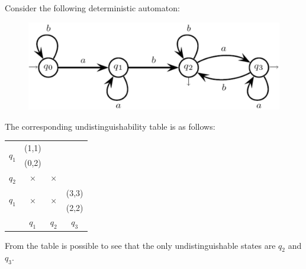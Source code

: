\begin{example}
    Consider the following deterministic automaton: 
    \begin{figure}[H]
        \centering
        \includegraphics[width=0.5\linewidth]{images/fsamin.png}
    \end{figure}
    The corresponding undistinguishability table is as follows: 
    \begin{table}[H]
        \centering
        \begin{tabular}{cclcccc}
        \cline{2-3}
        \multicolumn{1}{c|}{\multirow{2}{*}{$q_1$}} & \multicolumn{2}{c|}{(1,1)}                     &                        &                       &              &             \\
        \multicolumn{1}{c|}{}                       & \multicolumn{2}{c|}{(0,2)}                     &                        &                       &              &             \\ \cline{2-5}
        \multicolumn{1}{c|}{\multirow{2}{*}{$q_2$}} & \multicolumn{2}{c|}{\multirow{2}{*}{$\times$}} & \multicolumn{2}{c|}{\multirow{2}{*}{$\times$}} &              &             \\
        \multicolumn{1}{c|}{}                       & \multicolumn{2}{c|}{}                          & \multicolumn{2}{c|}{}                          &              &             \\ \cline{2-7} 
        \multicolumn{1}{c|}{\multirow{2}{*}{$q_1$}} & \multicolumn{2}{c|}{\multirow{2}{*}{$\times$}} & \multicolumn{2}{c|}{\multirow{2}{*}{$\times$}} & \multicolumn{2}{c|}{(3,3)} \\
        \multicolumn{1}{c|}{}                       & \multicolumn{2}{c|}{}                          & \multicolumn{2}{c|}{}                          & \multicolumn{2}{c|}{(2,2)} \\ \cline{2-7} 
                                                    & \multicolumn{2}{c}{$q_1$}                      & \multicolumn{2}{c}{$q_2$}                      & \multicolumn{2}{c}{$q_3$} 
        \end{tabular}
    \end{table}
    From the table is possible to see that the only undistinguishable states are $q_2$ and $q_3$.
\end{example}

